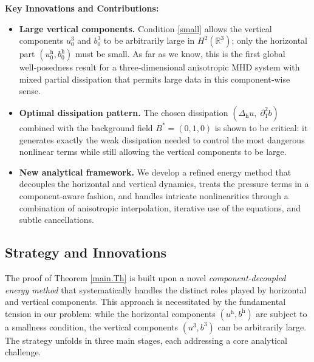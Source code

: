 \documentclass[11pt]{amsart}
\theoremstyle{definition}
\numberwithin{equation}{section}
\begin{document}
\noindent \textbf{Key Innovations and Contributions:}
\begin{itemize}
	\item \textbf{Large vertical components.} Condition \eqref{small} allows the vertical components $u^3_0$ and $b^3_0$ to be arbitrarily large in $H^2(\mathbb{R}^3)$; only the horizontal part $(u^\mathrm{h}_0,b^\mathrm{h}_0)$ must be small. As far as we know, this is the first global well‑posedness result for a three‑dimensional anisotropic MHD system with mixed partial dissipation that permits large data in this component‑wise sense.
	\item \textbf{Optimal dissipation pattern.} The chosen dissipation $(\Delta_{\mathrm{h}} u,\; \partial_1^2 b)$ combined with the background field $B^*=(0,1,0)$ is shown to be critical: it generates exactly the weak dissipation needed to control the most dangerous nonlinear terms while still allowing the vertical components to be large.
	\item \textbf{New analytical framework.} We develop a refined energy method that decouples the horizontal and vertical dynamics, treats the pressure terms in a component‑aware fashion, and handles intricate nonlinearities through a combination of anisotropic interpolation, iterative use of the equations, and subtle cancellations.
\end{itemize}



\subsection{Strategy and Innovations}

The proof of Theorem \ref{main.Th} is built upon a novel \emph{component-decoupled energy method} that systematically handles the distinct roles played by horizontal and vertical components. This approach is necessitated by the fundamental tension in our problem: while the horizontal components $(u^\mathrm{h}, b^\mathrm{h})$ are subject to a smallness condition, the vertical components $(u^3, b^3)$ can be arbitrarily large. The strategy unfolds in three main stages, each addressing a core analytical challenge.
\end{document}
